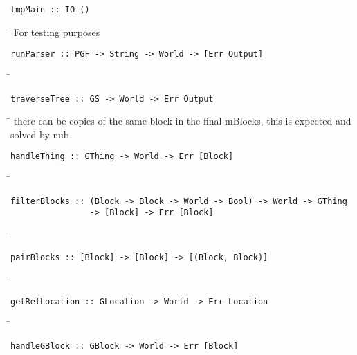 \begin{verbatim}
tmpMain :: IO ()
\end{verbatim}
\begin{tabbing}
\hspace*{1cm}\= \kill
\> For testing purposes
\end{tabbing}
\begin{verbatim}
runParser :: PGF -> String -> World -> [Err Output]
\end{verbatim}
\begin{tabbing}
\hspace*{1cm}\= \kill
\> 
\end{tabbing}
\begin{verbatim}
traverseTree :: GS -> World -> Err Output
\end{verbatim}
\begin{tabbing}
\hspace*{1cm}\= \kill
\> there can be copies of the same block in the final mBlocks, this is expected and \\
\> solved by nub
\end{tabbing}
\begin{verbatim}
handleThing :: GThing -> World -> Err [Block]
\end{verbatim}
\begin{tabbing}
\hspace*{1cm}\= \kill
\> 
\end{tabbing}
\begin{verbatim}
filterBlocks :: (Block -> Block -> World -> Bool) -> World -> GThing 
                -> [Block] -> Err [Block]
\end{verbatim}
\begin{tabbing}
\hspace*{1cm}\= \kill
\> 
\end{tabbing}
\begin{verbatim}
pairBlocks :: [Block] -> [Block] -> [(Block, Block)]
\end{verbatim}
\begin{tabbing}
\hspace*{1cm}\= \kill
\> 
\end{tabbing}
\begin{verbatim}
getRefLocation :: GLocation -> World -> Err Location
\end{verbatim}
\begin{tabbing}
\hspace*{1cm}\= \kill
\> 
\end{tabbing}
\begin{verbatim}
handleGBlock :: GBlock -> World -> Err [Block]
\end{verbatim}
